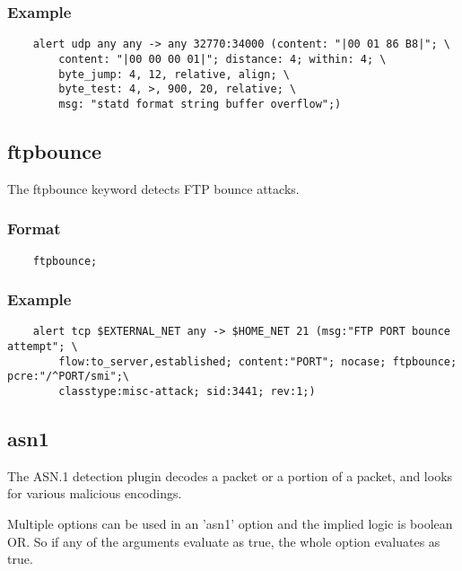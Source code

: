 \documentclass[english]{report}
\begin{document}
\subsubsection{Example}

\begin{verbatim}
    alert udp any any -> any 32770:34000 (content: "|00 01 86 B8|"; \
        content: "|00 00 00 01|"; distance: 4; within: 4; \
        byte_jump: 4, 12, relative, align; \
        byte_test: 4, >, 900, 20, relative; \
        msg: "statd format string buffer overflow";)
\end{verbatim}

\subsection{ftpbounce}

The ftpbounce keyword detects FTP bounce attacks.

\subsubsection{Format}
                                                                                
\begin{verbatim}
    ftpbounce;
\end{verbatim}

\subsubsection{Example}

\begin{verbatim}
    alert tcp $EXTERNAL_NET any -> $HOME_NET 21 (msg:"FTP PORT bounce attempt"; \
        flow:to_server,established; content:"PORT"; nocase; ftpbounce; pcre:"/^PORT/smi";\
        classtype:misc-attack; sid:3441; rev:1;)
\end{verbatim}

\subsection{asn1}
\label{asn1}

The ASN.1 detection plugin decodes a packet or a portion of a packet, and looks
for various malicious encodings.

Multiple options can be used in an 'asn1' option and the implied logic is
boolean OR.  So if any of the arguments evaluate as true, the whole option
evaluates as true.
\end{document}
